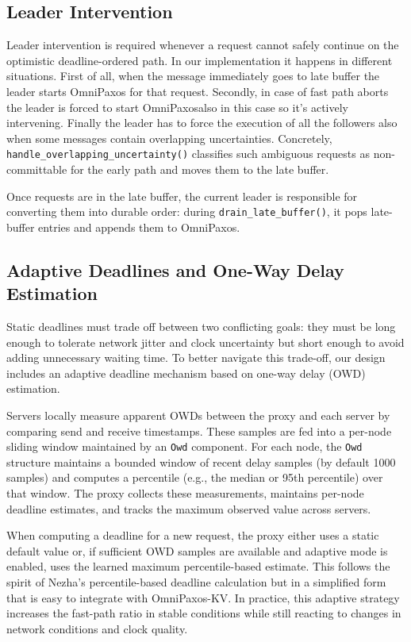 \documentclass{article}
\begin{document}
\subsection{Leader Intervention}
Leader intervention is required whenever a request cannot safely continue on the optimistic deadline-ordered path. 
In our implementation it happens in different situations. First of all, when the message immediately goes to late buffer the leader starts OmniPaxos for that request. 
Secondly, in case of fast path aborts the leader is forced to start OmniPaxosalso in this case so it's actively intervening.
Finally the leader has to force the execution of all the followers also when some messages contain overlapping uncertainties.
Concretely, \texttt{handle\_overlapping\_uncertainty()} classifies such ambiguous requests as non-committable for the early path and moves them to the late buffer.

Once requests are in the late buffer, the current leader is responsible for converting them into durable order: during \texttt{drain\_late\_buffer()}, it pops late-buffer entries and appends them to OmniPaxos. 

\subsection{Adaptive Deadlines and One-Way Delay Estimation}
\label{subsec:adaptive-deadlines}
Static deadlines must trade off between two conflicting goals: they must be long enough to tolerate network jitter and clock uncertainty but short enough to avoid adding unnecessary waiting time. To better navigate this trade-off, our design includes an adaptive deadline mechanism based on one-way delay (OWD) estimation.

Servers locally measure apparent OWDs between the proxy and each server by comparing send and receive timestamps. These samples are fed into a per-node sliding window maintained by an \texttt{Owd} component. For each node, the \texttt{Owd} structure maintains a bounded window of recent delay samples (by default 1000 samples) and computes a percentile (e.g., the median or 95th percentile) over that window. The proxy collects these measurements, maintains per-node deadline estimates, and tracks the maximum observed value across servers.

When computing a deadline for a new request, the proxy either uses a static default value or, if sufficient OWD samples are available and adaptive mode is enabled, uses the learned maximum percentile-based estimate. This follows the spirit of Nezha's percentile-based deadline calculation but in a simplified form that is easy to integrate with OmniPaxos-KV. In practice, this adaptive strategy increases the fast-path ratio in stable conditions while still reacting to changes in network conditions and clock quality.
\end{document}
